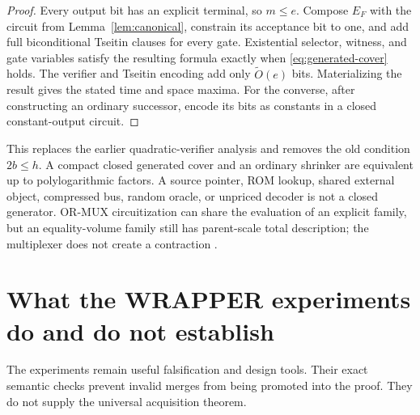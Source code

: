 \documentclass[11pt]{article}
\begin{document}
\begin{proof}
Every output bit has an explicit terminal, so $m\le e$.  Compose $E_F$ with
the circuit from Lemma~\ref{lem:canonical}, constrain its acceptance bit to
one, and add full biconditional Tseitin clauses for every gate.  Existential
selector, witness, and gate variables satisfy the resulting formula exactly
when \eqref{eq:generated-cover} holds.  The verifier and Tseitin encoding add
only $\widetilde O(e)$ bits.  Materializing the result gives the stated time
and space maxima.  For the converse, after constructing an ordinary
successor, encode its bits as constants in a closed constant-output circuit.
\end{proof}

This replaces the earlier quadratic-verifier analysis and removes the old
condition $2b\le h$.  A compact closed generated cover and an ordinary
shrinker are equivalent up to polylogarithmic factors.  A source pointer,
ROM lookup, shared external object, compressed bus, random oracle, or
unpriced decoder is not a closed generator.  OR-MUX circuitization can share
the evaluation of an explicit family, but an equality-volume family still
has parent-scale total description; the multiplexer does not create a
contraction \cite{pippengerfischer1979}.

\section{What the WRAPPER experiments do and do not establish}

The experiments remain useful falsification and design tools.  Their exact
semantic checks prevent invalid merges from being promoted into the proof.
They do not supply the universal acquisition theorem.
\end{document}
